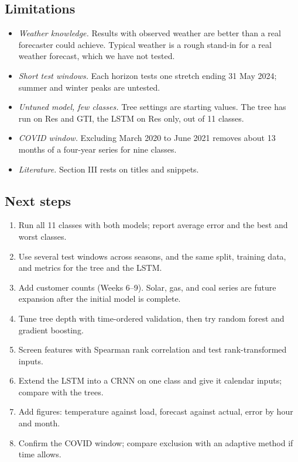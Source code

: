 \documentclass[10pt,letterpaper,twocolumn]{article}
\begin{document}
\subsection{Limitations}
\begin{itemize}
\item \textit{Weather knowledge.} Results with observed weather are better than a real forecaster could achieve. Typical weather is a rough stand-in for a real weather forecast, which we have not tested.
\item \textit{Short test windows.} Each horizon tests one stretch ending 31 May 2024; summer and winter peaks are untested.
\item \textit{Untuned model, few classes.} Tree settings are starting values. The tree has run on Res and GTI, the LSTM on Res only, out of 11 classes.
\item \textit{COVID window.} Excluding March 2020 to June 2021 removes about 13 months of a four-year series for nine classes.
\item \textit{Literature.} Section III rests on titles and snippets.
\end{itemize}

\subsection{Next steps}
\begin{enumerate}[leftmargin=1.6em]
\item Run all 11 classes with both models; report average error and the best and worst classes.
\item Use several test windows across seasons, and the same split, training data, and metrics for the tree and the LSTM.
\item Add customer counts (Weeks 6--9). Solar, gas, and coal series are future expansion after the initial model is complete.
\item Tune tree depth with time-ordered validation, then try random forest and gradient boosting.
\item Screen features with Spearman rank correlation and test rank-transformed inputs.
\item Extend the LSTM into a CRNN on one class and give it calendar inputs; compare with the trees.
\item Add figures: temperature against load, forecast against actual, error by hour and month.
\item Confirm the COVID window; compare exclusion with an adaptive method if time allows.
\end{enumerate}
\end{document}
